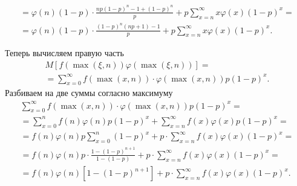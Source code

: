 \begin{enumerate}[label=\alph*)]
\begin{equation*}
\begin{split}
        = \varphi \left( n \right) \left( 1 - p \right) \cdot
        \frac{np \left( 1 - p \right)^n - 1 + \left( 1 - p \right)^n}{p} +
        p \sum \limits_{x = n}^{ \infty } x \varphi \left( x \right) \left( 1 - p \right)^x = \\
        = \varphi \left( n \right) \left( 1 - p \right) \cdot
        \frac{ \left( 1 - p \right)^n \left( np + 1 \right) - 1}{p} +
        p \sum \limits_{x = n}^{ \infty } x \varphi \left( x \right) \left( 1 - p \right)^x.
      \end{split}
    \end{equation*}

  Теперь вычисляем правую часть
  \begin{equation*}
    \begin{split}
      M \left[
        f \left( \max \left( \xi, n \right) \right) \varphi \left( \max \left( \xi, n \right) \right)
      \right] = \\
      = \sum \limits_{x = 0}^{ \infty }
        f \left( \max \left( x, n \right) \right) \cdot
        \varphi \left( \max \left( x, n \right) \right) p \left( 1 - p \right)^x.
    \end{split}
  \end{equation*}
  Разбиваем на две суммы согласно максимуму
  \begin{equation*}
    \begin{split}
      \sum \limits_{x = 0}^{ \infty }
        f \left( \max \left( x, n \right) \right) \cdot
        \varphi \left( \max \left( x, n \right) \right) p \left( 1 - p \right)^x = \\
      = \sum \limits_{x = 0}^n f \left( n \right) \varphi \left( n \right) p \left( 1 - p \right)^x +
      \sum \limits_{x = n}^{ \infty }
        f \left( x \right) \varphi \left( x \right) p \left( 1 - p \right)^x = \\
      = f \left( n \right) \varphi \left( n \right) p \sum \limits_{x = 0}^n \left( 1 - p \right)^x +
      p \cdot
      \sum \limits_{x = n}^{ \infty }
        f \left( x \right) \varphi \left( x \right) \left( 1 - p \right)^x = \\
      = f \left( n \right) \varphi \left( n \right) p \cdot
      \frac{1 - \left( 1 - p \right)^{n + 1}}{1 - \left( 1 - p \right) } +
      p \cdot
      \sum \limits_{x = n}^{ \infty }
        f \left( x \right) \varphi \left( x \right) \left( 1 - p \right)^x = \\
      = f \left( n \right) \varphi \left( n \right) \left[ 1 - \left( 1 - p \right)^{n + 1} \right] +
      p \cdot
      \sum \limits_{x = n}^{ \infty }
        f \left( x \right) \varphi \left( x \right) \left( 1 - p \right)^x.
    \end{split}
  \end{equation*}


\end{enumerate}
